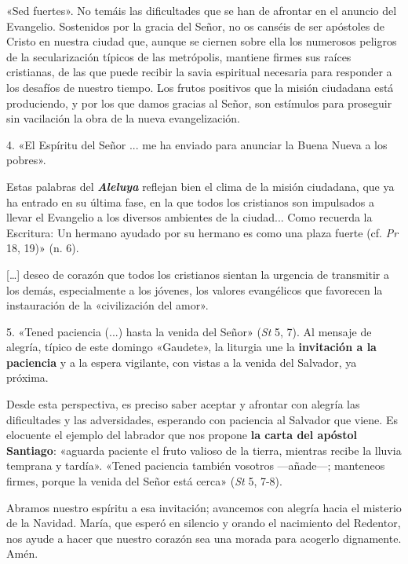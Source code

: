 \documentclass[]{article}
\begin{document}
«Sed fuertes». No temáis las dificultades que se han de afrontar en el
anuncio del Evangelio. Sostenidos por la gracia del Señor, no os canséis
de ser apóstoles de Cristo en nuestra ciudad que, aunque se ciernen
sobre ella los numerosos peligros de la secularización típicos de las
metrópolis, mantiene firmes sus raíces cristianas, de las que puede
recibir la savia espiritual necesaria para responder a los desafíos de
nuestro tiempo. Los frutos positivos que la misión ciudadana está
produciendo, y por los que damos gracias al Señor, son estímulos para
proseguir sin vacilación la obra de la nueva evangelización.

4. «El Espíritu del Señor ... me ha enviado para anunciar la Buena Nueva
a los pobres».

Estas palabras del \emph{\textbf{Aleluya}} reflejan bien el clima de la
misión ciudadana, que ya ha entrado en su última fase, en la que todos
los cristianos son impulsados a llevar el Evangelio a los diversos
ambientes de la ciudad... Como recuerda la Escritura: Un hermano ayudado
por su hermano es como una plaza fuerte (cf. \emph{Pr} 18, 19)» (n. 6).

[\ldots{}] deseo de corazón que todos los cristianos sientan la urgencia
de transmitir a los demás, especialmente a los jóvenes, los valores
evangélicos que favorecen la instauración de la «civilización del amor».

5. «Tened paciencia (...) hasta la venida del Señor» (\emph{St} 5, 7).
Al mensaje de alegría, típico de este domingo «Gaudete», la liturgia une
la \textbf{invitación a la paciencia} y a la espera vigilante, con
vistas a la venida del Salvador, ya próxima.

Desde esta perspectiva, es preciso saber aceptar y afrontar con alegría
las dificultades y las adversidades, esperando con paciencia al Salvador
que viene. Es elocuente el ejemplo del labrador que nos propone
\textbf{la carta del apóstol Santiago}: «aguarda paciente el fruto
valioso de la tierra, mientras recibe la lluvia temprana y tardía».
«Tened paciencia también vosotros ---añade---; manteneos firmes, porque
la venida del Señor está cerca» (\emph{St} 5, 7-8).

Abramos nuestro espíritu a esa invitación; avancemos con alegría hacia
el misterio de la Navidad. María, que esperó en silencio y orando el
nacimiento del Redentor, nos ayude a hacer que nuestro corazón sea una
morada para acogerlo dignamente. Amén.

\protect\hypertarget{_Toc448662746}{}{\protect\hypertarget{_Toc448690265}{}{}}
\end{document}
